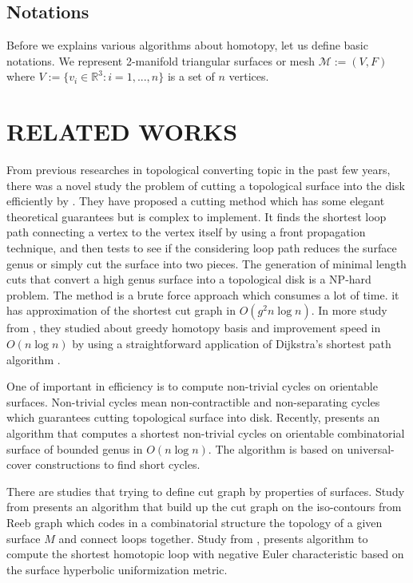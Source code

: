 \documentclass[a4paper,twoside]{article}
\begin{document}
\subsection{Notations}
Before we explains various algorithms about homotopy, let us define basic notations. We represent 2-manifold triangular surfaces or mesh $\mathscr{M}:=(V,F)$ where $V:=\{ v_{i}\in \mathbb{R}^3 : i = 1, ... , n\}$ is a set of $n$ vertices.

\section{\uppercase{Related Works}}
\noindent From previous researches in topological converting topic in the past few years, there was a novel study the problem of cutting a topological surface into the disk efficiently by \cite{Erickson:2002:OCS:513400.513430}. They have proposed a cutting method which has some elegant theoretical guarantees but is complex to implement. It finds the shortest loop path connecting a vertex to the vertex itself by using a front propagation technique, and then tests to see if the considering loop path reduces the surface genus or simply cut the surface into two pieces. The generation of minimal length cuts that convert a high genus surface into a topological disk is a NP-hard problem. The method is a brute force approach which consumes a lot of time. it has approximation of the shortest cut graph in $O(g^2 n \log n)$. In more study from \cite{Erickson:2005:GOH:1070432.1070581}, they studied about greedy homotopy basis and improvement speed in $O(n \log n)$
by using a straightforward application of Dijkstra's shortest path algorithm \cite{Dijkstra59anote}. 

One of important in efficiency is to compute non-trivial cycles on orientable surfaces. Non-trivial cycles mean non-contractible and non-separating cycles which guarantees cutting topological surface into disk. Recently, \cite{Kutz:2006:CSN:1137856.1137919} presents an algorithm that computes a shortest non-trivial cycles on orientable combinatorial surface of bounded genus in  $O(n \log n)$. The algorithm is based on universal-cover constructions to find short cycles.

There are studies that trying to define cut graph by properties of surfaces. Study from \cite{Patane:2007:FCB:1224804.1224947} presents an algorithm that build up the cut graph on the iso-contours from Reeb graph which codes in a combinatorial structure the topology of a given surface $M$ and connect loops together. Study from \cite{Jin:2013:CSH:2396897.2396971}, presents algorithm to compute the shortest homotopic loop with negative Euler characteristic based on the surface hyperbolic uniformization metric.
\end{document}

